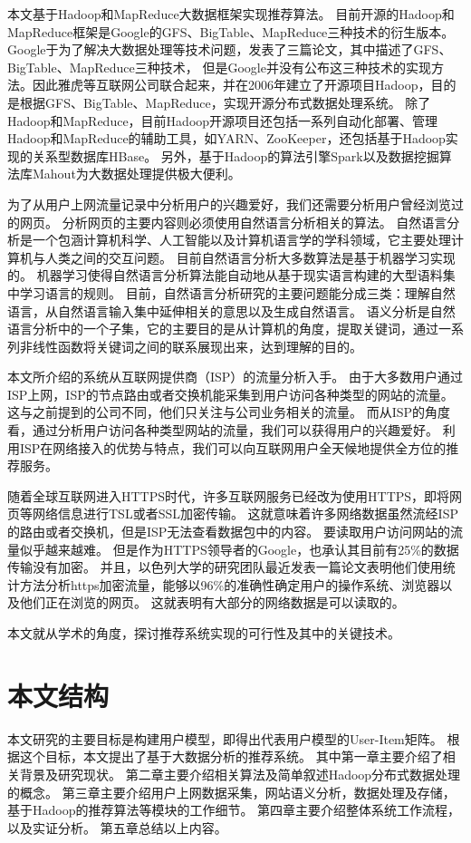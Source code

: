 本文基于Hadoop和MapReduce大数据框架实现推荐算法。
目前开源的Hadoop和MapReduce框架是Google的GFS、BigTable、MapReduce三种技术的衍生版本。
Google于为了解决大数据处理等技术问题，发表了三篇论文，其中描述了GFS、BigTable、MapReduce三种技术\supercite{Ghemawat2004MapReduce,Ghemawat2003The,Chang2008Bigtable}，
但是Google并没有公布这三种技术的实现方法。因此雅虎等互联网公司联合起来，并在2006年建立了开源项目Hadoop，目的是根据GFS、BigTable、MapReduce，实现开源分布式数据处理系统。
除了Hadoop和MapReduce，目前Hadoop开源项目还包括一系列自动化部署、管理Hadoop和MapReduce的辅助工具，如YARN、ZooKeeper，还包括基于Hadoop实现的关系型数据库HBase。
另外，基于Hadoop的算法引擎Spark以及数据挖掘算法库Mahout为大数据处理提供极大便利。

为了从用户上网流量记录中分析用户的兴趣爱好，我们还需要分析用户曾经浏览过的网页。
分析网页的主要内容则必须使用自然语言分析相关的算法。
自然语言分析是一个包涵计算机科学、人工智能以及计算机语言学的学科领域，它主要处理计算机与人类之间的交互问题。
目前自然语言分析大多数算法是基于机器学习实现的。
机器学习使得自然语言分析算法能自动地从基于现实语言构建的大型语料集中学习语言的规则。
目前，自然语言分析研究的主要问题能分成三类：理解自然语言，从自然语言输入集中延伸相关的意思以及生成自然语言。
语义分析是自然语言分析中的一个子集，它的主要目的是从计算机的角度，提取关键词，通过一系列非线性函数将关键词之间的联系展现出来，达到理解的目的。

本文所介绍的系统从互联网提供商（ISP）的流量分析入手。
由于大多数用户通过ISP上网，ISP的节点路由或者交换机能采集到用户访问各种类型的网站的流量。
这与之前提到的公司不同，他们只关注与公司业务相关的流量。
而从ISP的角度看，通过分析用户访问各种类型网站的流量，我们可以获得用户的兴趣爱好。
利用ISP在网络接入的优势与特点，我们可以向互联网用户全天候地提供全方位的推荐服务。

随着全球互联网进入HTTPS时代，许多互联网服务已经改为使用HTTPS，即将网页等网络信息进行TSL或者SSL加密传输。
这就意味着许多网络数据虽然流经ISP的路由或者交换机，但是ISP无法查看数据包中的内容。
要读取用户访问网站的流量似乎越来越难。
但是作为HTTPS领导者的Google，也承认其目前有25\%的数据传输没有加密。
并且，以色列大学的研究团队最近发表一篇论文表明他们使用统计方法分析https加密流量，能够以96\%的准确性确定用户的操作系统、浏览器以及他们正在浏览的网页。
这就表明有大部分的网络数据是可以读取的。

本文就从学术的角度，探讨推荐系统实现的可行性及其中的关键技术。

\section{本文结构}
本文研究的主要目标是构建用户模型，即得出代表用户模型的User-Item矩阵。
根据这个目标，本文提出了基于大数据分析的推荐系统。
其中第一章主要介绍了相关背景及研究现状。
第二章主要介绍相关算法及简单叙述Hadoop分布式数据处理的概念。
第三章主要介绍用户上网数据采集，网站语义分析，数据处理及存储，基于Hadoop的推荐算法等模块的工作细节。
第四章主要介绍整体系统工作流程，以及实证分析。
第五章总结以上内容。